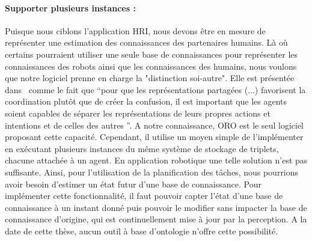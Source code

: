 \paragraph{Supporter plusieurs instances :} Puisque nous ciblons l'application HRI, nous devons être en mesure de représenter une estimation des connaissances des partenaires humains. Là où certains pourraient utiliser une seule base de connaissances pour représenter les connaissances des robots ainsi que les connaissances des humains, nous voulons que notre logiciel prenne en charge la "distinction soi-autre". Elle est présentée dans~\cite{pacherie_2012_phenomenology} comme le fait que ``pour que les représentations partagées (...) favorisent la coordination plutôt que de créer la confusion, il est important que les agents soient capables de séparer les représentations de leurs propres actions et intentions et de celles des autres ''. A notre connaissance, ORO est le seul logiciel proposant cette capacité. Cependant, il utilise un moyen simple de l'implémenter en exécutant plusieurs instances du même système de stockage de triplets, chacune attachée à un agent. En application robotique une telle solution n'est pas suffisante. Ainsi, pour l'utilisation de la planification des tâches, nous pourrions avoir besoin d'estimer un état futur d'une base de connaissance. Pour implémenter cette fonctionnalité, il faut pouvoir capter l'état d'une base de connaissance à un instant donné puis pouvoir le modifier sans impacter la base de connaissance d'origine, qui est continuellement mise à jour par la perception. A la date de cette thèse, aucun outil à base d'ontologie n'offre cette possibilité.

